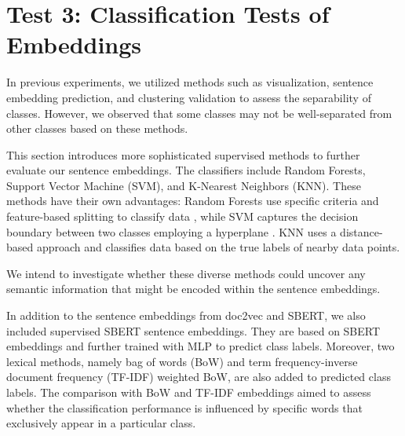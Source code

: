 \documentclass[11pt]{article}
\begin{document}
\section{Test 3: Classification Tests of Embeddings}\label{sec:classification}




In previous experiments, we utilized methods such as visualization, sentence embedding prediction, and clustering validation to assess the separability of classes. However, we observed that some classes may not be well-separated from other classes based on these methods. 

This section introduces more sophisticated supervised methods to further evaluate our sentence embeddings.
The classifiers include Random Forests, Support Vector Machine (SVM), and K-Nearest Neighbors (KNN). These methods have their own advantages: Random Forests use specific criteria and feature-based splitting to classify data \cite{breiman2001random, cutler2012random}, while SVM captures the decision boundary between two classes employing a hyperplane \cite{scholkopf1999advances, smola2004tutorial}. KNN uses a distance-based approach and classifies data based on the true labels of nearby data points. 

We intend to investigate whether these diverse methods could uncover any semantic information that might be encoded within the sentence embeddings.

In addition to the sentence embeddings from doc2vec and SBERT, we also included supervised SBERT sentence embeddings. They are  based on SBERT embeddings and further trained with MLP to predict class labels. Moreover, two lexical methods, namely bag of words (BoW) and term frequency-inverse document frequency (TF-IDF) weighted BoW, are also added to predicted class labels. The comparison with BoW and TF-IDF embeddings aimed to assess whether the classification performance is influenced by specific words that exclusively appear in a particular class. 

\end{document}
